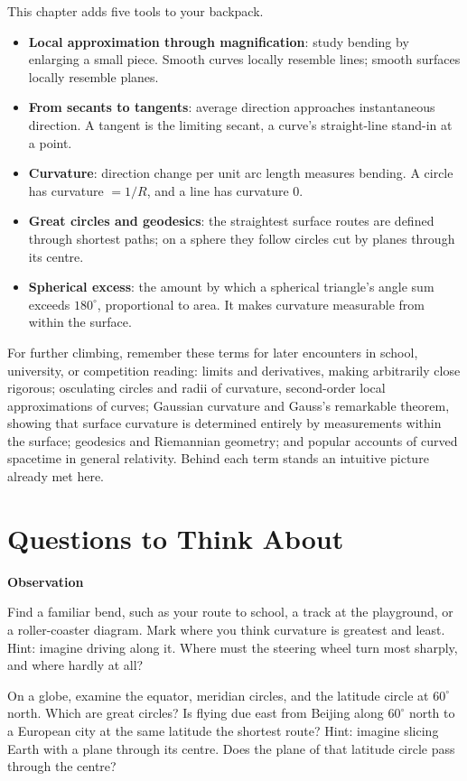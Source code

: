 \begin{toolbox}
This chapter adds five tools to your backpack.
\begin{itemize}
  \item \textbf{Local approximation through magnification}: study bending by enlarging a small piece. Smooth curves locally resemble lines; smooth surfaces locally resemble planes.
  \item \textbf{From secants to tangents}: average direction approaches instantaneous direction. A tangent is the limiting secant, a curve's straight-line stand-in at a point.
  \item \textbf{Curvature}: direction change per unit arc length measures bending. A circle has curvature $= 1/R$, and a line has curvature $0$.
  \item \textbf{Great circles and geodesics}: the straightest surface routes are defined through shortest paths; on a sphere they follow circles cut by planes through its centre.
  \item \textbf{Spherical excess}: the amount by which a spherical triangle's angle sum exceeds $180^\circ$, proportional to area. It makes curvature measurable from within the surface.
\end{itemize}
\end{toolbox}

\begin{pandeng}
For further climbing, remember these terms for later encounters in school, university, or competition reading: limits and derivatives, making arbitrarily close rigorous; osculating circles and radii of curvature, second-order local approximations of curves; Gaussian curvature and Gauss's remarkable theorem, showing that surface curvature is determined entirely by measurements within the surface; geodesics and Riemannian geometry; and popular accounts of curved spacetime in general relativity. Behind each term stands an intuitive picture already met here.
\end{pandeng}

\section*{Questions to Think About}

\textbf{Observation}

\begin{sikao}
  \item Find a familiar bend, such as your route to school, a track at the playground, or a roller-coaster diagram. Mark where you think curvature is greatest and least. Hint: imagine driving along it. Where must the steering wheel turn most sharply, and where hardly at all?
  \item On a globe, examine the equator, meridian circles, and the latitude circle at $60^\circ$ north. Which are great circles? Is flying due east from Beijing along $60^\circ$ north to a European city at the same latitude the shortest route? Hint: imagine slicing Earth with a plane through its centre. Does the plane of that latitude circle pass through the centre?
\end{sikao}

